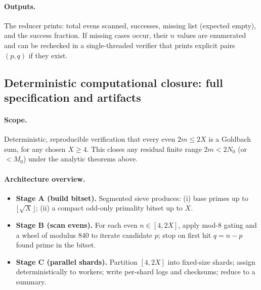 \documentclass[11pt]{article}
\theoremstyle{definition}
\theoremstyle{remark}
\begin{document}
\paragraph{Outputs.} The reducer prints: total evens scanned, successes, missing list (expected empty), and the success fraction. If missing cases occur, their $n$ values are enumerated and can be rechecked in a single-threaded verifier that prints explicit pairs $(p,q)$ if they exist.

\subsection*{Deterministic computational closure: full specification and artifacts}
\paragraph{Scope.} Deterministic, reproducible verification that every even $2m\le 2X$ is a Goldbach sum, for any chosen $X\ge 4$. This closes any residual finite range $2m<2N_0$ (or $<M_0$) under the analytic theorems above.

\paragraph{Architecture overview.}
\begin{itemize}
  \item \textbf{Stage A (build bitset).} Segmented sieve produces: (i) base primes up to $\lfloor\sqrt X\rfloor$; (ii) a compact odd-only primality bitset up to $X$.
  \item \textbf{Stage B (scan evens).} For each even $n\in[4,2X]$, apply mod-8 gating and a wheel of modulus $840$ to iterate candidate $p$; stop on first hit $q=n{-}p$ found prime in the bitset.
  \item \textbf{Stage C (parallel shards).} Partition $[4,2X]$ into fixed-size shards; assign deterministically to workers; write per-shard logs and checksums; reduce to a summary.
\end{itemize}
\end{document}
